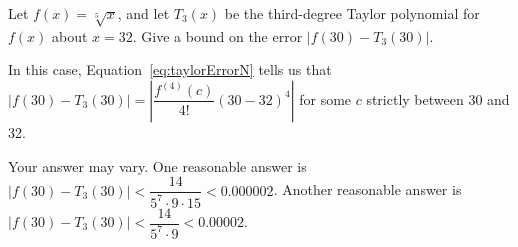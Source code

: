 \begin{question}
Let $f(x)=\sqrt[5]{x}$, and let $T_3(x)$ be the third-degree Taylor polynomial for $f(x)$ about $x=32$. Give a bound on the error $|f(30)-T_3(30)|$.
\end{question}
\begin{hint}
In this case, Equation~\ref*{eq:taylorErrorN} tells us that
$\left|f(30)-T_3(30)\right| = \left|\dfrac{f^{(4)}(c)}{4!}(30-32)^{4}\right|$ for some $c$ strictly between 30 and 32.

\end{hint}
\begin{answer}
Your answer may vary. One reasonable answer is\\
$\left|f(30)-T_3(30)\right|<\dfrac{14}{5^7\cdot9\cdot15}<0.000002$. Another reasonable answer is\\
$\left|f(30)-T_3(30)\right|<\dfrac{14}{5^7\cdot9}<0.00002$.
\end{answer}
